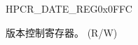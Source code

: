 \begin{register}{H}{PCR\_DATE\_REG}{0x0FFC}\label{regdesc:PCRDATEREG}
%
%
\regnewline%
\begin{regdesc}\begin{reglist}
\label{fielddesc:PCRDATE}\item [PCR\_DATE] 版本控制寄存器。 (R/W)
\end{reglist}\end{regdesc}
\end{register}
